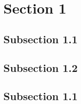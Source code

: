 \documentclass{article}
\begin{document}
 
 \section{Section 1}
 
 \textcolor{yellow}{\lipsum[1]}

\subsection{Subsection 1.1}

\textcolor{yellow}{\lipsum[1-3]}

\subsection{Subsection 1.2}

\textcolor{yellow}{\lipsum[5-6]}

\subsection{Subsection 1.1}

\textcolor{yellow}{\lipsum}
\end{document}
